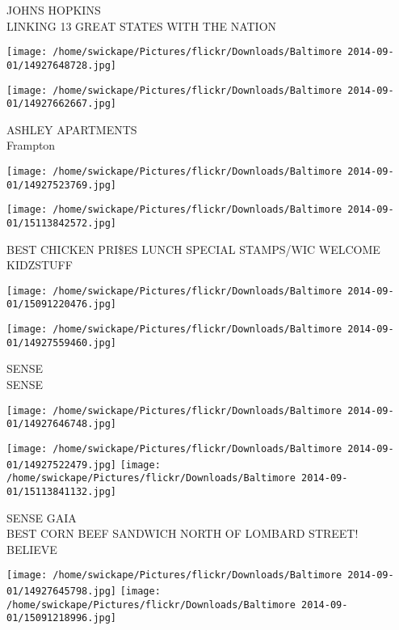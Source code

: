 \documentclass[10pt,letterpaper]{article}
\begin{document}
JOHNS HOPKINS\\
LINKING 13 GREAT STATES WITH THE NATION\\
\pagebreak

\texttt{[image: /home/swickape/Pictures/flickr/Downloads/Baltimore 2014-09-01/14927648728.jpg]}

\vspace{0.25in}
\texttt{[image: /home/swickape/Pictures/flickr/Downloads/Baltimore 2014-09-01/14927662667.jpg]}

ASHLEY APARTMENTS\\
Frampton\\
\pagebreak

\texttt{[image: /home/swickape/Pictures/flickr/Downloads/Baltimore 2014-09-01/14927523769.jpg]}

\vspace{0.25in}
\texttt{[image: /home/swickape/Pictures/flickr/Downloads/Baltimore 2014-09-01/15113842572.jpg]}

BEST CHICKEN PRI\$ES LUNCH SPECIAL STAMPS/WIC WELCOME\\
KIDZSTUFF\\
\pagebreak

\texttt{[image: /home/swickape/Pictures/flickr/Downloads/Baltimore 2014-09-01/15091220476.jpg]}

\vspace{0.25in}
\texttt{[image: /home/swickape/Pictures/flickr/Downloads/Baltimore 2014-09-01/14927559460.jpg]}

SENSE\\
SENSE\\
\pagebreak

\texttt{[image: /home/swickape/Pictures/flickr/Downloads/Baltimore 2014-09-01/14927646748.jpg]}

\vspace{0.25in}
\texttt{[image: /home/swickape/Pictures/flickr/Downloads/Baltimore 2014-09-01/14927522479.jpg]}
\texttt{[image: /home/swickape/Pictures/flickr/Downloads/Baltimore 2014-09-01/15113841132.jpg]}

SENSE GAIA\\
BEST CORN BEEF SANDWICH NORTH OF LOMBARD STREET!\\
BELIEVE\\
\pagebreak

\texttt{[image: /home/swickape/Pictures/flickr/Downloads/Baltimore 2014-09-01/14927645798.jpg]}
\texttt{[image: /home/swickape/Pictures/flickr/Downloads/Baltimore 2014-09-01/15091218996.jpg]}
\end{document}
